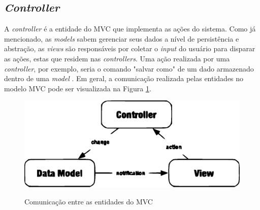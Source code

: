 \subsection{\textit{Controller}}

A \textit{controller} é a entidade do MVC que implementa as ações do sistema. Como já mencionado, as \textit{models} sabem gerenciar seus dados a nível de persistência e abstração, as \textit{views} são responsáveis por coletar o \textit{input} do usuário para disparar as ações, estas que residem nas \textit{controllers}. Uma ação realizada por uma \textit{controller}, por exemplo, seria o comando "salvar como" de um dado armazenado dentro de uma \textit{model} \cite{Bucanek2009}.
Em geral, a comunicação realizada pelas entidades no modelo MVC pode ser visualizada na Figura \ref{fig:diagrama_mvc}.

\begin{figure}
    \centering
    \caption{Comunicação entre as entidades do MVC}
    \includegraphics[width=\textwidth]{figuras/diagrama_mvc.eps}
    \label{fig:diagrama_mvc}
\end{figure}